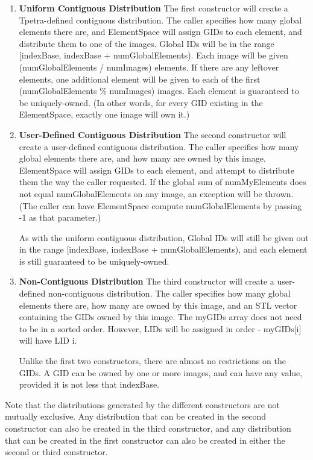 \documentclass[10pt,relax]{TpetraDesign}
\begin{document}
\begin{enumerate}
\item \textbf{Uniform Contiguous Distribution}
The first constructor will create a Tpetra-defined contiguous distribution. The caller specifies how many global elements there are, and ElementSpace will assign GIDs to each element, and distribute them to one of the images. Global IDs will be in the range [indexBase, indexBase + numGlobalElements). Each image will be given (numGlobalElements / numImages) elements. If there are any leftover elements, one additional element will be given to each of the first (numGlobalElements \% numImages) images.
Each element is guaranteed to be uniquely-owned. (In other words, for every GID existing in the ElementSpace, exactly one image will own it.)

\item \textbf{User-Defined Contiguous Distribution}
The second constructor will create a user-defined contiguous distribution. The caller specifies how many global elements there are, and how many are owned by this image. ElementSpace will assign GIDs to each element, and attempt to distribute them the way the caller requested. If the global sum of numMyElements does not equal numGlobalElements on any image, an exception will be thrown. (The caller can have ElementSpace compute numGlobalElements by passing -1 as that parameter.)

As with the uniform contiguous distribution, Global IDs will still be given out in the range [indexBase, indexBase + numGlobalElements), and each element is still guaranteed to be uniquely-owned.

\item \textbf{Non-Contiguous Distribution}
The third constructor will create a user-defined non-contiguous distribution. The caller specifies how many global elements there are, how many are owned by this image, and an STL vector containing the GIDs owned by this image. The myGIDs array does not need to be in a sorted order. However, LIDs will be assigned in order - myGIDs[i] will have LID i.

Unlike the first two constructors, there are almost no restrictions on the GIDs. A GID can be owned by one or more images, and can have any value, provided it is not less that indexBase.

\end{enumerate}

Note that the distributions generated by the different constructors are not mutually exclusive. Any distribution that can be created in the second constructor can also be created in the third constructor, and any distribution that can be created in the first constructor can also be created in either the second or third constructor.
\end{document}
